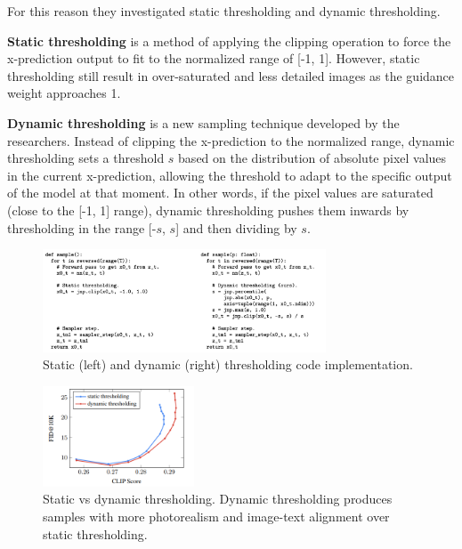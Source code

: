 For this reason they investigated static thresholding and dynamic thresholding.

\textbf{Static thresholding} is a method of applying the clipping operation to force the x-prediction output to fit to the normalized range of [-1, 1]. However, static thresholding still result in over-saturated and less detailed images as the guidance weight approaches 1.

\textbf{Dynamic thresholding} is a new sampling technique developed by the researchers. Instead of clipping the x-prediction to the normalized range, dynamic thresholding sets a threshold $s$ based on the distribution of absolute pixel values in the current x-prediction, allowing the threshold to adapt to the specific output of the model at that moment. In other words, if the pixel values are saturated (close to the [-1, 1] range), dynamic thresholding pushes them inwards by thresholding in the range [-$s$, $s$] and then dividing by $s$.

\begin{figure}
    \centering
    \includegraphics[width=0.75\textwidth]{images/imagen/static_dynamic_thresholding.png}
    \caption{Static (left) and dynamic (right) thresholding code implementation.}
    \label{fig:imagen_dynamic_thresholding}
\end{figure}

\begin{figure}
    \centering
    \includegraphics[width=0.4\textwidth]{images/imagen/static_vs_dynamic_thresholding.png}
    \caption{Static vs dynamic thresholding. Dynamic thresholding produces samples with more photorealism and image-text alignment over static thresholding.}
    \label{fig:imagen_static_vs_dynamic_thresholding}
\end{figure}

